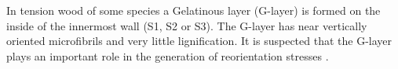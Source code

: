 In tension wood of some species a Gelatinous layer (G-layer)
is formed on the inside of the innermost wall (S1, S2 or S3)\cite{gardiner2014biology}. The
G-layer has near vertically oriented microfibrils and very little lignification.
It is suspected that the G-layer plays an important role in the generation of
reorientation stresses \cite{Pilate_2004}.